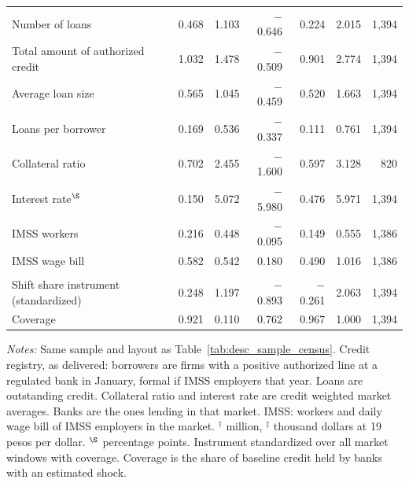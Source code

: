 \documentclass[12pt]{article}
\begin{document}
\begin{table}[H]
\begin{threeparttable}
\begin{tabular}{l r r r r r r}
            Number of loans & 0.468 & 1.103 & $-$0.646 & 0.224 & 2.015 & 1,394 \\
            Total amount of authorized credit & 1.032 & 1.478 & $-$0.509 & 0.901 & 2.774 & 1,394 \\
            Average loan size & 0.565 & 1.045 & $-$0.459 & 0.520 & 1.663 & 1,394 \\
            Loans per borrower & 0.169 & 0.536 & $-$0.337 & 0.111 & 0.761 & 1,394 \\
            Collateral ratio & 0.702 & 2.455 & $-$1.600 & 0.597 & 3.128 & 820 \\
            Interest rate$^{\S}$ & 0.150 & 5.072 & $-$5.980 & 0.476 & 5.971 & 1,394 \\
            IMSS workers & 0.216 & 0.448 & $-$0.095 & 0.149 & 0.555 & 1,386 \\
            IMSS wage bill & 0.582 & 0.542 & 0.180 & 0.490 & 1.016 & 1,386 \\
            \addlinespace[3pt]
            \multicolumn{7}{l}{\textit{Panel C. Instrument}} \\
            Shift share instrument (standardized) & 0.248 & 1.197 & $-$0.893 & $-$0.261 & 2.063 & 1,394 \\
            Coverage & 0.921 & 0.110 & 0.762 & 0.967 & 1.000 & 1,394 \\
            \bottomrule
        \end{tabular}
        \begin{tablenotes}[flushleft]
            \footnotesize
            \item \textit{Notes:} Same sample and layout as Table~\ref{tab:desc_sample_census}. Credit registry, as delivered: borrowers are firms with a positive authorized line at a regulated bank in January, formal if IMSS employers that year. Loans are outstanding credit. Collateral ratio and interest rate are credit weighted market averages. Banks are the ones lending in that market. IMSS: workers and daily wage bill of IMSS employers in the market. $^{\dagger}$ million, $^{\ddagger}$ thousand dollars at 19 pesos per dollar. $^{\S}$ percentage points. Instrument standardized over all market windows with coverage. Coverage is the share of baseline credit held by banks with an estimated shock. 
        \end{tablenotes}
    \end{threeparttable}
\end{table}
\end{document}
